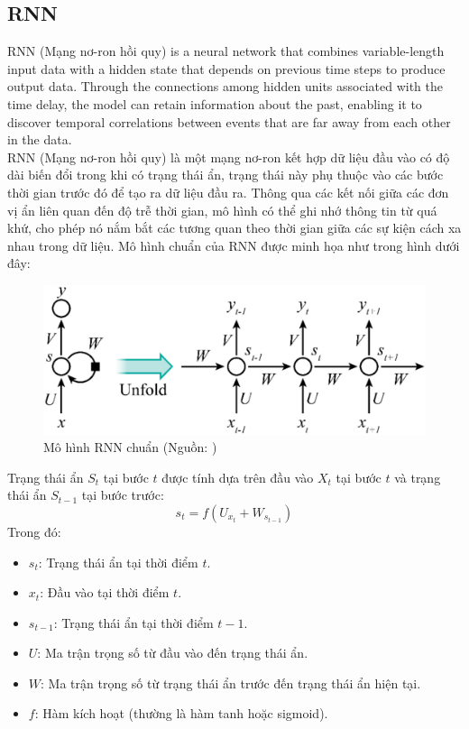 \documentclass[conference]{IEEEtran}
\begin{document}
\subsection{RNN}
RNN (Mạng nơ-ron hồi quy) is a neural network that combines variable-length input data with a hidden state that depends on previous time steps to produce output data. Through the connections among hidden units associated with the time delay, the model can retain information about the past, enabling it to discover temporal correlations between events that are far away from each other in the data.\cite{RNN}\\
RNN (Mạng nơ-ron hồi quy) là một mạng nơ-ron kết hợp dữ liệu đầu vào có độ dài biến đổi trong khi có trạng thái ẩn, trạng thái này phụ thuộc vào các bước thời gian trước đó để tạo ra dữ liệu đầu ra. Thông qua các kết nối giữa các đơn vị ẩn liên quan đến độ trễ thời gian, mô hình có thể ghi nhớ thông tin từ quá khứ, cho phép nó nắm bắt các tương quan theo thời gian giữa các sự kiện cách xa nhau trong dữ liệu.
Mô hình chuẩn của RNN được minh họa như trong hình dưới đây:\\
\begin{figure}[H]
    \centering
    \begin{minipage}{0.8\linewidth}
    \centering
        \includegraphics[width=\linewidth]{images/RNN.png}
    \caption{Mô hình RNN chuẩn (Nguồn: \cite{DeepLearning})}
    \label{fig7}
    \end{minipage}
\end{figure}
Trạng thái ẩn \( S_t \) tại bước \( t \) được tính dựa trên đầu vào  \( X_t \) tại bước \( t \) và trạng thái ẩn \( S_{t-1} \) tại bước trước:
\[s_{t} = f(U_{x_{t}} + W_{s_{t-1}})\]
Trong đó:
\begin{itemize}
    \item \( s_t \): Trạng thái ẩn tại thời điểm \( t \).
    \item \( x_{t} \): Đầu vào tại thời điểm \( t \).
    \item \( s_{t-1} \): Trạng thái ẩn tại thời điểm \( t-1 \).
    \item \( U \): Ma trận trọng số từ đầu vào đến trạng thái ẩn.
    \item \( W \): Ma trận trọng số từ trạng thái ẩn trước đến trạng thái ẩn hiện tại.
    \item \( f \): Hàm kích hoạt (thường là hàm tanh hoặc sigmoid).
\end{itemize}
\end{document}
